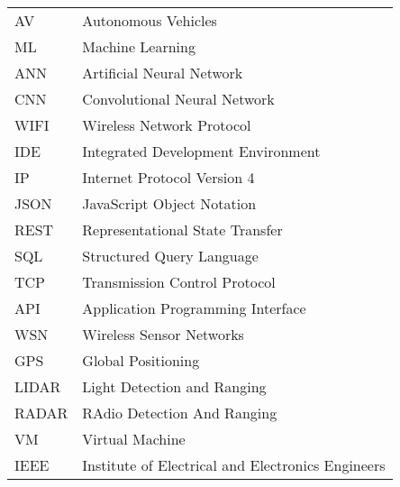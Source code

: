 






\begin{tabular}{p{}p{}}

	AV&Autonomous Vehicles\\
	ML&Machine Learning\\
	ANN&Artificial Neural Network\\
	CNN&Convolutional Neural Network\\
	WIFI&Wireless Network Protocol\\
	IDE&Integrated Development Environment\\
	IP&Internet Protocol Version 4\\
	JSON&JavaScript Object Notation\\
	REST&Representational State Transfer\\
	SQL&Structured Query Language\\
	TCP&Transmission Control Protocol\\
	API&Application Programming Interface\\
	WSN&Wireless Sensor Networks\\
	GPS&Global Positioning \\
    LIDAR&Light Detection and Ranging\\
    RADAR&RAdio Detection And Ranging\\
	VM&Virtual Machine\\
	IEEE&Institute of Electrical and Electronics Engineers\\


\end{tabular}

